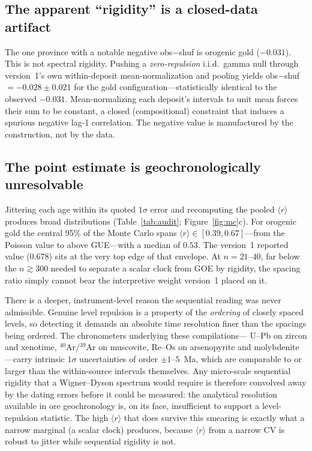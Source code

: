 \documentclass[12pt,a4paper]{article}
\newcommand{\rbar}{\langle r\rangle}
\begin{document}
\subsection{The apparent ``rigidity'' is a closed-data artifact}
The one province with a notable negative obs$-$shuf is orogenic gold
($-0.031$). This is not spectral rigidity. Pushing a \emph{zero-repulsion} i.i.d.\
gamma null through version~1's own within-deposit mean-normalization and pooling
yields obs$-$shuf$=-0.028\pm0.021$ for the gold configuration---statistically
identical to the observed $-0.031$. Mean-normalizing each deposit's intervals to
unit mean forces their sum to be constant, a closed (compositional) constraint
that induces a spurious negative lag-1 correlation. The negative value is
manufactured by the construction, not by the data.

\subsection{The point estimate is geochronologically unresolvable}
Jittering each age within its quoted $1\sigma$ error and recomputing the pooled
$\rbar$ produces broad distributions (Table~\ref{tab:audit};
Figure~\ref{fig:mc}c). For orogenic gold the central 95\% of the Monte Carlo
spans $\rbar\in[0.39,0.67]$---from the Poisson value to above GUE---with a median
of $0.53$. The version~1 reported value ($0.678$) sits at the very top edge of
that envelope. At $n=21$--$40$, far below the $n\gtrsim300$ needed to separate a
scalar clock from GOE by rigidity, the spacing ratio simply cannot bear the
interpretive weight version~1 placed on it.

There is a deeper, instrument-level reason the sequential reading was never
admissible. Genuine level repulsion is a property of the \emph{ordering} of
closely spaced levels, so detecting it demands an absolute time resolution finer
than the spacings being ordered. The chronometers underlying these compilations---
U--Pb on zircon and xenotime, $^{40}$Ar/$^{39}$Ar on muscovite, Re--Os on
arsenopyrite and molybdenite---carry intrinsic $1\sigma$ uncertainties of order
$\pm 1$--$5$~Ma, which are comparable to or larger than the within-source
intervals themselves. Any micro-scale sequential rigidity that a Wigner--Dyson
spectrum would require is therefore convolved away by the dating errors before it
could be measured: the analytical resolution available in ore geochronology is, on
its face, insufficient to support a level-repulsion statistic. The high $\rbar$
that does survive this smearing is exactly what a narrow marginal (a scalar clock)
produces, because $\rbar$ from a narrow CV is robust to jitter while sequential
rigidity is not.
\end{document}
